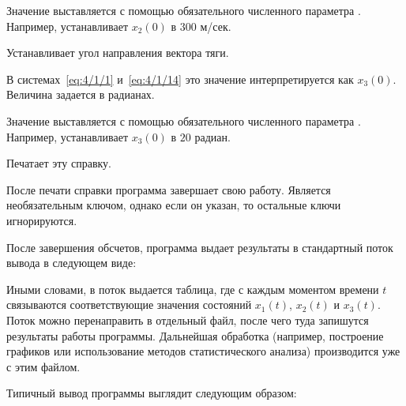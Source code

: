         Значение выставляется с помощью обязательного численного параметра . Например,  устанавливает $x_2(0)$ в $300$ м/сек.

    \item[\code{-x3~num}]
        Устанавливает угол направления вектора тяги.

        В системах~\ref{eq:4/1/1} и~\ref{eq:4/1/14} это значение интерпретируется как $x_3(0)$. Величина задается в радианах.

        Значение выставляется с помощью обязательного численного параметра . Например,  устанавливает $x_3(0)$ в $20$ радиан.

    \item[\code{--help}]
        Печатает эту справку.

        После печати справки программа завершает свою работу. Является необязательным ключом, однако если он указан, то остальные ключи игнорируются.
\edescr

После завершения обсчетов, программа выдает результаты в стандартный поток вывода в следующем виде:


Иными словами, в поток выдается таблица, где с каждым моментом времени $t$ связываются соответствующие значения состояний $x_1(t)$, $x_2(t)$ и $x_3(t)$. Поток можно перенаправить в отдельный файл, после чего туда запишутся результаты работы программы. Дальнейшая обработка (например, построение графиков или использование методов статистического анализа) производится уже с этим файлом.

Типичный вывод программы выглядит следующим образом:



